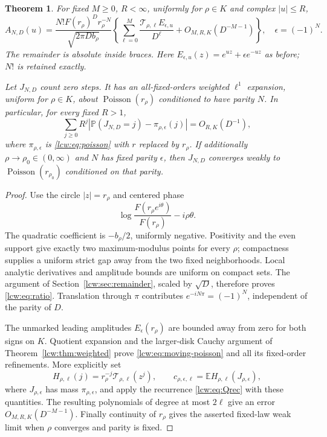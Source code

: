 \documentclass[11pt,letterpaper]{article}
\newtheorem{theorem}{Theorem}[section]
\theoremstyle{remark}\newtheorem{remark}[theorem]{Remark}
\newcommand{\E}{\mathbb E}\newcommand{\Pp}{\mathbb P}
\newcommand{\Poi}{\operatorname{Poisson}}\newcommand{\Normal}{\mathcal N}
\newcommand{\TT}{\mathcal T}\newcommand{\PP}{\mathcal P}
\begin{document}
\begin{theorem}\label{lcw:thm:ratio}
For fixed $M\ge0$, $R<\infty$, uniformly for $\rho\in K$ and complex $|u|\le R$,
\begin{equation}\label{lcw:eq:ratio}
 A_{N,D}(u)=\frac{N!F(r_\rho)^D r_\rho^{-N}}{\sqrt{2\pi D b_\rho}}
 \left\{\sum_{\ell=0}^M\frac{\TT_{\rho,\ell}E_{\epsilon,u}}{D^\ell}
                  +O_{M,R,K}(D^{-M-1})\right\},\quad\epsilon=(-1)^N.
\end{equation}
The remainder is absolute inside braces. Here $E_{\epsilon,u}(z)=e^{uz}+\epsilon e^{-uz}$ as before; $N!$ is retained exactly.

Let $J_{N,D}$ count zero steps. It has an all-fixed-orders weighted $\ell^1$ expansion, uniform for $\rho\in K$, about $\Poi(r_\rho)$ conditioned to have parity $N$. In particular, for every fixed $R>1$,
\begin{equation}\label{lcw:eq:moving-poisson}
 \sum_{j\ge0}R^j\left|\Pp(J_{N,D}=j)-\pi_{\rho,\epsilon}(j)\right|=O_{R,K}(D^{-1}),
\end{equation}
where $\pi_{\rho,\epsilon}$ is \eqref{lcw:eq:poisson} with $r$ replaced by $r_\rho$.
If additionally $\rho\to\rho_0\in(0,\infty)$ and $N$ has fixed parity $\epsilon$, then $J_{N,D}$ converges weakly to $\Poi(r_{\rho_0})$ conditioned on that parity.
\end{theorem}
\begin{proof}
Use the circle $|z|=r_\rho$ and centered phase
\[
 \log\frac{F(r_\rho e^{i\theta})}{F(r_\rho)}-i\rho\theta.
\]
The quadratic coefficient is $-b_\rho/2$, uniformly negative. Positivity and the even support give exactly two maximum-modulus points for every $\rho$; compactness supplies a uniform strict gap away from the two fixed neighborhoods. Local analytic derivatives and amplitude bounds are uniform on compact sets. The argument of Section~\ref{lcw:sec:remainder}, scaled by $\sqrt D$, therefore proves \eqref{lcw:eq:ratio}. Translation through $\pi$ contributes $e^{-iN\pi}=(-1)^N$, independent of the parity of $D$.

The unmarked leading amplitudes $E_\epsilon(r_\rho)$ are bounded away from zero for both signs on $K$. Quotient expansion and the larger-disk Cauchy argument of Theorem~\ref{lcw:thm:weighted} prove \eqref{lcw:eq:moving-poisson} and all its fixed-order refinements. More explicitly set
\[
 H_{\rho,\ell}(j)=r_\rho^{-j}\TT_{\rho,\ell}(z^j),\qquad
 c_{\rho,\epsilon,\ell}=\E H_{\rho,\ell}(J_{\rho,\epsilon}),
\]
where $J_{\rho,\epsilon}$ has mass $\pi_{\rho,\epsilon}$, and apply the recurrence \eqref{lcw:eq:Qrec} with these quantities. The resulting polynomials of degree at most $2\ell$ give an error $O_{M,R,K}(D^{-M-1})$. Finally continuity of $r_\rho$ gives the asserted fixed-law weak limit when $\rho$ converges and parity is fixed.
\end{proof}
\end{document}
